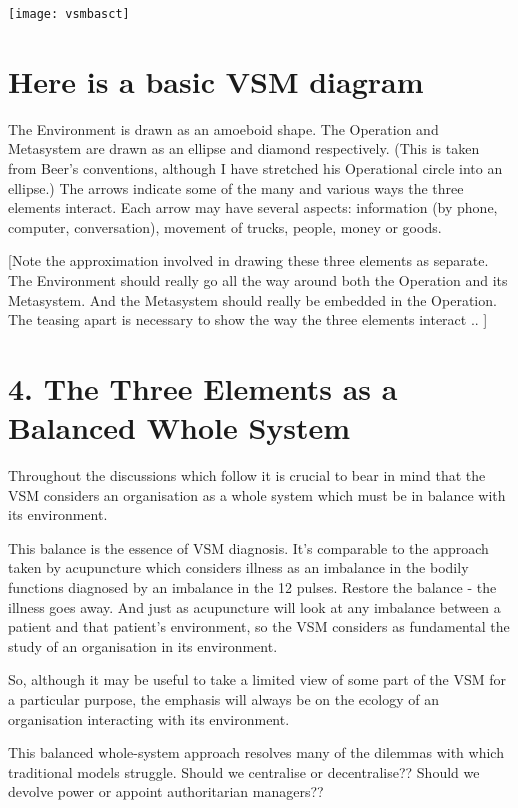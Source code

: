 \begin{center}
\texttt{[image: vsmbasct]}
\end{center}

\section*{Here is a basic VSM diagram}
The Environment is drawn as an amoeboid shape. The Operation and Metasystem are drawn as an ellipse and diamond respectively. (This is taken from Beer's conventions, although I have stretched his Operational circle into an ellipse.) The arrows indicate some of the many and various ways the three elements interact. Each arrow may have several aspects: information (by phone, computer, conversation), movement of trucks, people, money or goods.

{[}Note the approximation involved in drawing these three elements as separate. The Environment should really go all the way around both the Operation and its Metasystem. And the Metasystem should really be embedded in the Operation. The teasing apart is necessary to show the way the three elements interact .. {]}

\section*{4. The Three Elements as a Balanced Whole System}
Throughout the discussions which follow it is crucial to bear in mind that the VSM considers an organisation as a whole system which must be in balance with its environment.

This balance is the essence of VSM diagnosis. It's comparable to the approach taken by acupuncture which considers illness as an imbalance in the bodily functions diagnosed by an imbalance in the 12 pulses. Restore the balance - the illness goes away. And just as acupuncture will look at any imbalance between a patient and that patient's environment, so the VSM considers as fundamental the study of an organisation in its environment.

So, although it may be useful to take a limited view of some part of the VSM for a particular purpose, the emphasis will always be on the ecology of an organisation interacting with its environment.

This balanced whole-system approach resolves many of the dilemmas with which traditional models struggle. Should we centralise or decentralise?? Should we devolve power or appoint authoritarian managers??

